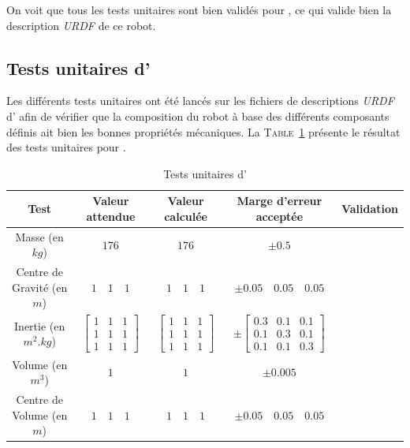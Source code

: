 			On voit que tous les tests unitaires sont bien validés pour \argos{}, ce qui valide bien la description \textit{URDF} de ce robot.

		\subsection{Tests unitaires d'\atoll{}}

			Les différents tests unitaires ont été lancés sur les fichiers de descriptions \textit{URDF} d'\atoll{} afin de vérifier que la composition du robot à base des différents composants définis ait bien les bonnes propriétés mécaniques. La \textsc{Table}~\ref{table:atoll_unittest} présente le résultat des tests unitaires pour \atoll{}.
			
			\begin{table}[!htb]
				\centering
				\begin{adjustbox}{max width=\textwidth}
					\begin{tabular}{|c|c|c|c|c|}
						\hline
						\textbf{Test} & \textbf{Valeur attendue} & \textbf{Valeur calculée} & \textbf{Marge d'erreur acceptée} & \textbf{Validation} \\
						\hline
						Masse (en $kg$) & $176$ & $176$ & $\pm 0.5$ & \cmark \\
						\hline
						Centre de Gravité (en $m$) & $1 \quad 1 \quad 1$ & $1 \quad 1 \quad 1$ & $\pm 0.05 \quad 0.05 \quad 0.05$ & \cmark \\
						\hline
						Inertie (en $m^2.kg$) & $\begin{bmatrix}1 & 1 & 1 \\ 1 & 1 & 1 \\ 1 & 1 & 1\end{bmatrix}$ & $\begin{bmatrix}1 & 1 & 1 \\ 1 & 1 & 1 \\ 1 & 1 & 1\end{bmatrix}$ & $\pm \begin{bmatrix}0.3 & 0.1 & 0.1 \\ 0.1 & 0.3 & 0.1 \\ 0.1 & 0.1 & 0.3\end{bmatrix}$ & \cmark \\
						\hline
						Volume (en $m^3$) & $1$ & $1$ & $\pm 0.005$ & \cmark \\
						\hline
						Centre de Volume (en $m$) & $1 \quad 1 \quad 1$ & $1 \quad 1 \quad 1$ & $\pm 0.05 \quad 0.05 \quad 0.05$ & \cmark \\
						\hline
					\end{tabular}
				\end{adjustbox}
				\caption{Tests unitaires d'\atoll{}}
				\label{table:atoll_unittest}
			\end{table}

